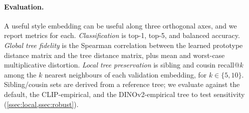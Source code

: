 \paragraph{Evaluation.} A useful style embedding can be useful along
three orthogonal axes, and we report metrics for each.
\emph{Classification} is top-1, top-5, and balanced accuracy.
\emph{Global tree fidelity} is the Spearman correlation between the
learned prototype distance matrix and the tree distance matrix, plus
mean and worst-case multiplicative distortion. \emph{Local tree
preservation} is sibling and cousin recall@$k$ among the $k$ nearest
neighbours of each validation embedding, for $k \in \{5, 10\}$.
Sibling/cousin sets are derived from a reference tree; we evaluate
against the default, the CLIP-empirical, and the DINOv2-empirical
tree to test sensitivity (\cref{ssec:local,ssec:robust}).
